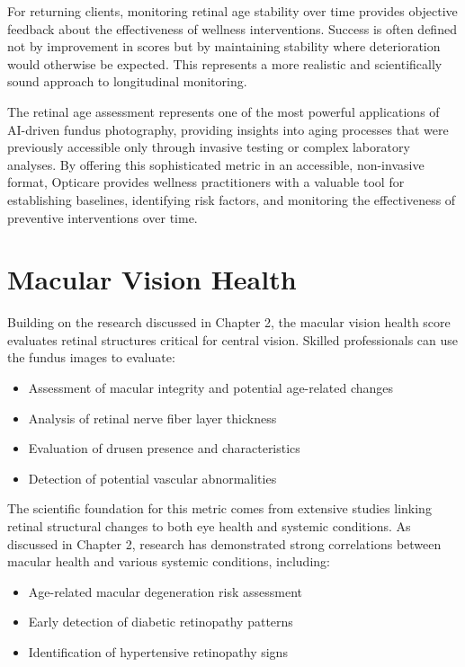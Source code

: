\documentclass[
  Letterpaper,
]{scrbook}
\providecommand{\tightlist}{%
  \setlength{\itemsep}{0pt}\setlength{\parskip}{0pt}}\usepackage{longtable,booktabs,array}
\begin{document}
For returning clients, monitoring retinal age stability over time
provides objective feedback about the effectiveness of wellness
interventions. Success is often defined not by improvement in scores but
by maintaining stability where deterioration would otherwise be
expected. This represents a more realistic and scientifically sound
approach to longitudinal monitoring.

The retinal age assessment represents one of the most powerful
applications of AI-driven fundus photography, providing insights into
aging processes that were previously accessible only through invasive
testing or complex laboratory analyses. By offering this sophisticated
metric in an accessible, non-invasive format, Opticare provides wellness
practitioners with a valuable tool for establishing baselines,
identifying risk factors, and monitoring the effectiveness of preventive
interventions over time.

\section{Macular Vision Health}\label{macular-vision-health}

Building on the research discussed in Chapter 2, the macular vision
health score evaluates retinal structures critical for central vision.
Skilled professionals can use the fundus images to evaluate:

\begin{itemize}
\tightlist
\item
  Assessment of macular integrity and potential age-related changes
\item
  Analysis of retinal nerve fiber layer thickness
\item
  Evaluation of drusen presence and characteristics
\item
  Detection of potential vascular abnormalities
\end{itemize}

The scientific foundation for this metric comes from extensive studies
linking retinal structural changes to both eye health and systemic
conditions. As discussed in Chapter 2, research has demonstrated strong
correlations between macular health and various systemic conditions,
including:

\begin{itemize}
\tightlist
\item
  Age-related macular degeneration risk assessment
\item
  Early detection of diabetic retinopathy patterns
\item
  Identification of hypertensive retinopathy signs
\end{itemize}
\end{document}
